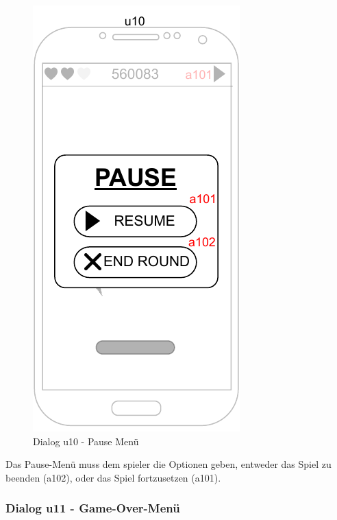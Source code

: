 \begin{figure}
    \begin{center}
    \includegraphics{diagramme/pdf/Mockup-u10.pdf}
\end{center}
    \caption{Dialog u10 - Pause Menü}
\end{figure}

Das Pause-Menü muss dem \gls{spieler} die Optionen geben, entweder das Spiel zu beenden (a102), oder das Spiel fortzusetzen (a101).

\clearpage

\subsubsection{Dialog u11 - Game-Over-Menü}

